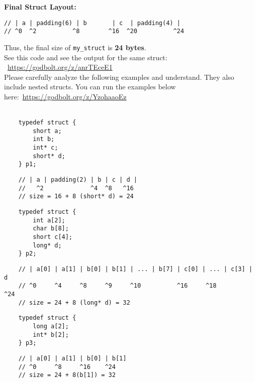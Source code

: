 \textbf{Final Struct Layout:}

\begin{verbatim}
// | a | padding(6) | b       | c  | padding(4) |
// ^0  ^2          ^8        ^16  ^20          ^24
\end{verbatim}

Thus, the final size of \texttt{my\_struct} is \textbf{24 bytes}. \\
See this code and see the output for the same struct: \\

~\url{https://godbolt.org/z/anrTEceE1} \\

Please carefully analyze the following examples and understand. They also 
include nested structs. You can run the examples below here:~\url{https://godbolt.org/z/YzohaaoEz} \\
\\
\begin{verbatim}
    typedef struct {
        short a; 
        int b;
        int* c;
        short* d;
    } p1;
    \end{verbatim}
    
    \begin{verbatim}
    // | a | padding(2) | b | c | d |
    //   ^2             ^4  ^8   ^16 
    // size = 16 + 8 (short* d) = 24
    \end{verbatim}
    
    \vspace{1em}
    
    \begin{verbatim}
    typedef struct {
        int a[2];
        char b[8];
        short c[4];
        long* d;
    } p2;
    \end{verbatim}
    
    \begin{verbatim}
    // | a[0] | a[1] | b[0] | b[1] | ... | b[7] | c[0] | ... | c[3] | d
    // ^0     ^4     ^8     ^9     ^10          ^16     ^18         ^24
    // size = 24 + 8 (long* d) = 32
    \end{verbatim}
    
    \vspace{1em}
    
    \begin{verbatim}
    typedef struct {
        long a[2];
        int* b[2];
    } p3;
    \end{verbatim}
    
    \begin{verbatim}
    // | a[0] | a[1] | b[0] | b[1]
    // ^0     ^8     ^16    ^24
    // size = 24 + 8(b[1]) = 32
    \end{verbatim}
    
